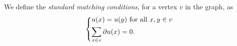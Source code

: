 

We define the \emph{standard matching conditions}, for a vertex $v$ in the graph, as
\begin{equation}
  \begin{dcases}
    u(x) = u(y) \text{ for all } x, y \in v \\
    \sum_{x \in v} \partial u(x) = 0.
  \end{dcases}
\end{equation}


